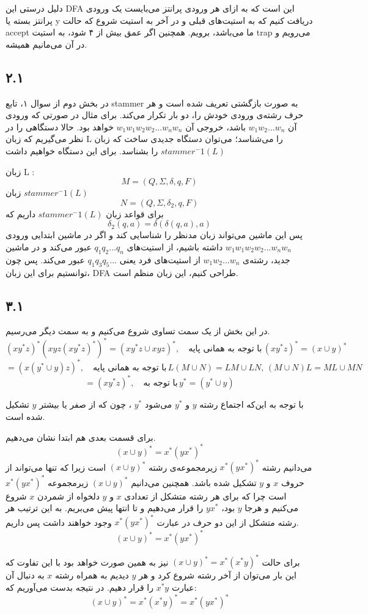 دلیل درستی این DFA این است که به ازای هر ورودی پرانتز می‌بایست یک ورودی پرانتز بسته یا y دریافت کنیم که به استیت‌های قبلی و در آخر به استیت شروع که حالت accept ما می‌باشد، برویم. همچنین اگر عمق بیش از ۴ شود، به استیت trap می‌رویم و در آن می‌مانیم همیشه.



\subsection*{۲.۱}

در بخش دوم از سوال ۱، تابع stammer به صورت بازگشتی تعریف شده است و هر حرف رشته‌ی ورودی خودش را، دو بار تکرار می‌کند. برای مثال در صورتی که ورودی آن
$w_1 w_2 ... w_n$
باشد، خروجی آن
$w_1 w_1  w_2 w_2 ... w_n w_n $
خواهد بود. حالا دستگاهی را در نظر می‌گیریم که زبان L را می‌شناسد؛ می‌توان دستگاه جدیدی ساخت که زبان
$stammer^-1 (L)$
را بشناسد. 	برای این دستگاه خواهیم داشت

زبان L :
$$M = (Q, \Sigma, \delta, q, F)$$
زبان 
$stammer^-1 (L)$
$$N = (Q, \Sigma, \delta_2, q, F)$$
برای قواعد زبان
$stammer^-1 (L)$
داریم که 
$$\delta_2 (q, a) = \delta (\delta (q, a), a)$$
پس این ماشین می‌تواند زبان مدنظر را شناسایی کند و اگر در ماشین ابتدایی ورودی 
$w_1 w_1  w_2 w_2 ... w_n w_n $
داشته باشیم، از استیت‌های 
$q_1 q_2 ... q_n $
عبور می‌کند و در ماشین جدید، رشته‌ی
$w_1 w_2 ... w_n$
از استیت‌های فرد یعنی
$q_1 q_3 q_5 ...$
عبور می‌کند.
پس چون توانستیم برای این زبان، DFA طراحی کنیم، این زبان منظم است.

\subsection*{۳.۱}

در این بخش از یک سمت تساوی شروع می‌کنیم و به سمت دیگر می‌رسیم.
$$(xy^{*}z)^{*}(xyz(xy^{*}z)^{*})^{*} = (xy^{*}z \cup xyz)^{*}, \quad \text{با توجه به همانی پایه} \, (xy^{*}z)^{*} = (x \cup y)^{*}$$
$$ = (x(y^{*} \cup y)z)^{*}, \quad \text{با توجه به همانی پایه} \, L(M \cup N) = LM \cup LN,\,(M \cup N) L = ML \cup MN$$
$$ = (xy^{*}z)^{*}, \quad \text{با توجه به} \, y^{*} = (y^{*} \cup y)$$


با توجه به این‌که اجتماع رشته
$y$
و
$y^{*}$
می‌شود
$y^{*}$
، چون که از صفر یا بیشتر
$y$
تشکیل شده است.

برای قسمت بعدی هم ابتدا نشان می‌دهیم.
$$(x \cup y)^{*} = x^{*}(yx^{*})^{*}$$
می‌دانیم رشته
$x^{*}(yx^{*})^{*}$
زیرمجموعه‌ی رشته
$(x \cup y)^{*}$
است زیرا که تنها می‌تواند از حروف
$x$
و
$y$
تشکیل شده باشد. همچنین می‌دانیم
$(x \cup y)^{*}$
زیرمجموعه
$x^{*}(yx^{*})^{*}$
است چرا که برای هر رشته متشکل از تعدادی
$x$
و
$y$
دلخواه از شمردن
$x$
شروع می‌کنیم و هرجا
$y$
بود،
$yx^{*}$
را قرار می‌دهیم و تا انتها پیش می‌بریم. به این ترتیب هر رشته متشکل از این دو حرف در عبارت
$x^{*}(yx^{*})^{*}$
وجود خواهند داشت پس داریم.
$$(x \cup y)^{*} = x^{*}(yx^{*})^{*}$$

برای حالت 
$(x \cup y)^{*} = x^{*}(x^{*} y)^{*}$
نیز به همین صورت خواهد بود با این تفاوت که این بار می‌توان از آخر رشته شروع کرد و هر
$y$
دیدیم به همراه رشته
$x$
به دنبال آن عبارت
$x^{*} y$
را قرار دهیم. در نتیجه بدست می‌آوریم که:
$$(x \cup y)^{*} = x^{*}(x^{*} y)^{*} = x^{*}(yx^{*})^{*}$$